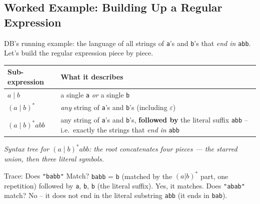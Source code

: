 \documentclass[full-course-notes.tex]{subfiles}
\begin{document}
\subsection{Worked Example: Building Up a Regular Expression}
\label{sec:l4-worked-example-build-up}

DB's running example: the language of all strings of \texttt{a}'s and \texttt{b}'s that
\emph{end in} \texttt{abb}. Let's build the regular expression piece by piece.

\begin{center}
\renewcommand{\arraystretch}{1.3}
\begin{tabularx}{\textwidth}{@{}l X@{}}
\toprule
\textbf{Sub-expression} & \textbf{What it describes} \\
\midrule
$a \mid b$ & a single \texttt{a} \emph{or} a single \texttt{b} \\
$(a \mid b)^{*}$ & \emph{any} string of \texttt{a}'s and \texttt{b}'s (including $\varepsilon$) \\
$(a \mid b)^{*}abb$ & any string of \texttt{a}'s and \texttt{b}'s, \textbf{followed by} the
literal suffix \texttt{abb} -- i.e.\ exactly the strings that \emph{end in} \texttt{abb} \\
\bottomrule
\end{tabularx}
\end{center}

\begin{center}
\end{center}
\begin{center}
\small\textit{Syntax tree for $(a\mid b)^{*}abb$: the root concatenates four pieces --- the
starred union, then three literal symbols.}
\end{center}

\begin{examplebox}{Trace: Does \texttt{"babb"} Match?}
\texttt{babb} = \texttt{b} (matched by the $(a|b)^*$ part, one repetition) followed by
\texttt{a}, \texttt{b}, \texttt{b} (the literal suffix). Yes, it matches. Does \texttt{"abab"}
match? No -- it does not end in the literal substring \texttt{abb} (it ends in \texttt{bab}).
\end{examplebox}
\end{document}
